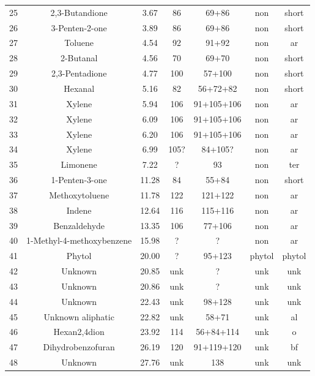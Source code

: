 \documentclass[preprint,review,12pt]{elsarticle}
\begin{document}
\begin{table}[h!]
\begin{center}
{\begin{tabular}{ccccccc}
  25 & 2,3-Butandione & 3.67 & 86 & 69+86 & non & short \\ 
  26 & 3-Penten-2-one & 3.89 & 86 & 69+86 & non & short \\ 
  27 & Toluene & 4.54 & 92 & 91+92 & non & ar \\ 
  28 & 2-Butanal & 4.56 & 70 & 69+70 & non & short \\ 
  29 & 2,3-Pentadione & 4.77 & 100 & 57+100 & non & short \\ 
  30 & Hexanal & 5.16 & 82 & 56+72+82 & non & short \\ 
  31 & Xylene & 5.94 & 106 & 91+105+106 & non & ar \\ 
  32 & Xylene & 6.09 & 106 & 91+105+106 & non & ar \\ 
  33 & Xylene & 6.20 & 106 & 91+105+106 & non & ar \\ 
  34 & Xylene & 6.99 & 105? & 84+105? & non & ar \\ 
  35 & Limonene & 7.22 & ? & 93 & non & ter \\ 
  36 & 1-Penten-3-one & 11.28 & 84 & 55+84 & non & short \\ 
  37 & Methoxytoluene & 11.78 & 122 & 121+122 & non & ar \\ 
  38 & Indene & 12.64 & 116 & 115+116 & non & ar \\ 
  39 & Benzaldehyde & 13.35 & 106 & 77+106 & non & ar \\ 
  40 & 1-Methyl-4-methoxybenzene & 15.98 & ? & ? & non & ar \\ 
  41 & Phytol & 20.00 & ? & 95+123 & phytol & phytol \\ 
  42 & Unknown & 20.85 & unk & ? & unk & unk \\ 
  43 & Unknown & 20.86 & unk & ? & unk & unk \\ 
  44 & Unknown & 22.43 & unk & 98+128 & unk & unk \\ 
  45 & Unknown aliphatic & 22.82 & unk & 58+71 & unk & al \\ 
  46 & Hexan2,4dion & 23.92 & 114 & 56+84+114 & unk & o \\ 
  47 & Dihydrobenzofuran & 26.19 & 120 & 91+119+120 & unk & bf \\ 
  48 & Unknown & 27.76 & unk & 138 & unk & unk \\ 
   \hline
\end{tabular}
}
\end{center}
\end{table}
\end{document}
